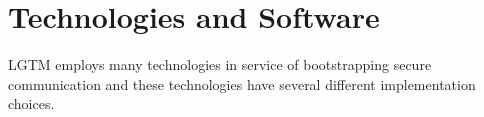 \documentclass[12pt]{report}
\begin{document}


\section{Technologies and Software}

LGTM employs many technologies in service of bootstrapping secure communication and these technologies have several different implementation choices. \par
\end{document}
